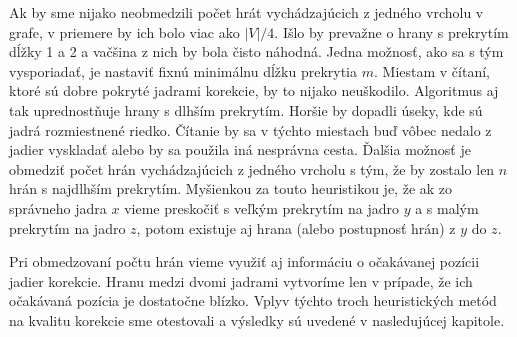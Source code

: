 Ak by sme nijako neobmedzili počet hrát vychádzajúcich z jedného vrcholu v grafe, v priemere by ich bolo viac ako $|V|/4$. Išlo by prevažne o hrany s prekrytím dĺžky 1 a 2 a vačšina z nich by bola čisto náhodná. Jedna možnosť, ako sa s tým vysporiadať, je nastaviť fixnú minimálnu dĺžku prekrytia $m$. Miestam v čítaní, ktoré sú dobre pokryté jadrami korekcie, by to nijako neuškodilo. Algoritmus aj tak uprednostňuje hrany s dlhším prekrytím. Horšie by dopadli úseky, kde sú jadrá rozmiestnené riedko. Čítanie by sa v týchto miestach buď vôbec nedalo z jadier vyskladať alebo by sa použila iná nesprávna cesta. Ďalšia možnosť je obmedziť počet hrán vychádzajúcich z jedného vrcholu s tým, že by zostalo len $n$ hrán s najdlhším prekrytím. Myšienkou za touto heuristikou je, že ak zo správneho jadra $x$ vieme preskočiť s veľkým prekrytím na jadro $y$ a s malým prekrytím na jadro $z$, potom existuje aj hrana (alebo postupnosť hrán) z $y$ do $z$. %

Pri obmedzovaní počtu hrán vieme využiť aj informáciu o očakávanej pozícii jadier korekcie. Hranu medzi dvomi jadrami vytvoríme len v prípade, že ich očakávaná pozícia je dostatočne blízko. Vplyv týchto troch heuristických metód na kvalitu korekcie sme otestovali a výsledky sú uvedené v nasledujúcej kapitole.